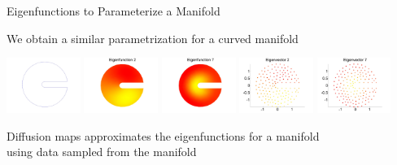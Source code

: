 \documentclass[12pt]{beamer}
\begin{document}
\begin{frame}{Eigenfunctions to Parameterize a Manifold}
    \centering
    {\small We obtain a similar parametrization for a curved manifold \par}
    \vspace{0.05in}
    \includegraphics[width=0.18\textwidth]{circle.jpg}
    \hspace{0.03\textwidth}
    \includegraphics[width=0.18\textwidth]{circle_efunc1.jpg}
    \includegraphics[width=0.18\textwidth]{circle_efunc6.jpg}
    \hspace{0.03\textwidth}
    \includegraphics[width=0.18\textwidth]{circle_evec1.jpg}
    \includegraphics[width=0.18\textwidth]{circle_evec6.jpg}\\

    \vspace{0.05in}

    {\small Diffusion maps approximates the eigenfunctions for a manifold \\ using data sampled from the manifold \par}

\end{frame}
\end{document}
